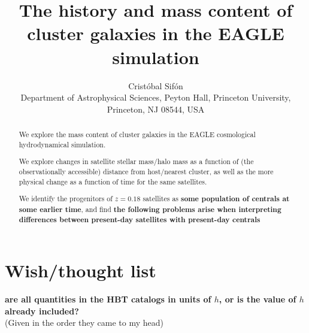 \documentclass[usenatbib,fleqn]{mnras}
\title[Mass content of satellites in EAGLE]{The history and mass content of cluster galaxies in the EAGLE simulation}
\author[C.\ Sif\'on]{Crist\'obal Sif\'on
\\
Department of Astrophysical Sciences, Peyton Hall, Princeton University, Princeton, NJ 08544, USA
}
\newcommand{\comment}[1]{\textbf{\color{magenta} #1}}
\newcommand{\Msun}{\mathrm{M}_\odot}
\begin{document}
\label{firstpage}
\pagerange{\pageref{firstpage}--\pageref{lastpage}}


\maketitle

\begin{abstract}
We explore the mass content of cluster galaxies in the EAGLE cosmological hydrodynamical simulation. 
  
  We explore changes in satellite stellar mass/halo mass as a function of (the observationally accessible) distance from host/nearest cluster, as well as the more physical change as a function of time for the same satellites.
  
  We identify the progenitors of $z=0.18$ satellites as \textbf{some population of centrals at some earlier time}, and find \textbf{the following problems arise when interpreting differences between present-day satellites with present-day centrals}

\end{abstract}



\section{Wish/thought list}


\comment{are all quantities in the HBT catalogs in units of $h$, or is the value of $h$ already included?}
\\

(Given in the order they came to my head)
\end{document}
